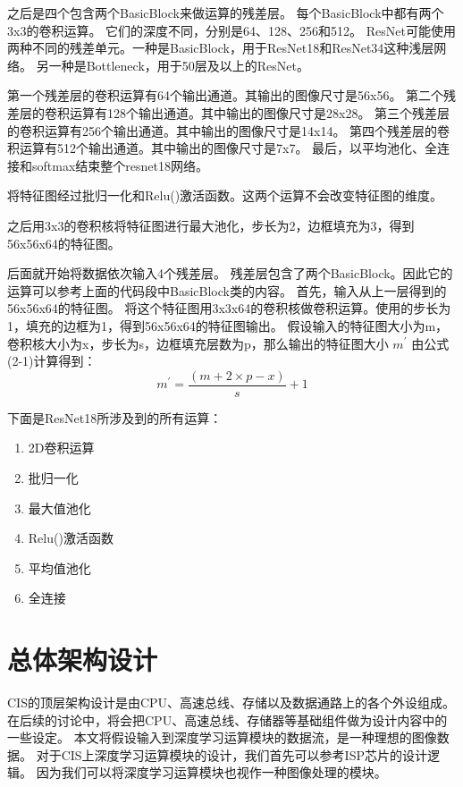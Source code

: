 之后是四个包含两个BasicBlock来做运算的残差层。
每个BasicBlock中都有两个3x3的卷积运算。
它们的深度不同，分别是64、128、256和512。
ResNet可能使用两种不同的残差单元。一种是BasicBlock，用于ResNet18和ResNet34这种浅层网络。
另一种是Bottleneck，用于50层及以上的ResNet。

第一个残差层的卷积运算有64个输出通道。其输出的图像尺寸是56x56。
第二个残差层的卷积运算有128个输出通道。其中输出的图像尺寸是28x28。
第三个残差层的卷积运算有256个输出通道。其中输出的图像尺寸是14x14。
第四个残差层的卷积运算有512个输出通道。其中输出的图像尺寸是7x7。
最后，以平均池化、全连接和softmax结束整个resnet18网络。


将特征图经过批归一化和Relu()激活函数。这两个运算不会改变特征图的维度。

之后用3x3的卷积核将特征图进行最大池化，步长为2，边框填充为3，得到56x56x64的特征图。

后面就开始将数据依次输入4个残差层。
残差层包含了两个BasicBlock。因此它的运算可以参考上面的代码段中BasicBlock类的内容。
首先，输入从上一层得到的56x56x64的特征图。
将这个特征图用3x3x64的卷积核做卷积运算。使用的步长为1，填充的边框为1，得到56x56x64的特征图输出。
假设输入的特征图大小为m，卷积核大小为x，步长为s，边框填充层数为p，那么输出的特征图大小 $m^{'}$ 由公式(2-1)计算得到：
\begin{equation}
m^{'} = \frac{( m + 2 \times p - x )}{s} + 1 
\end{equation}  


下面是ResNet18所涉及到的所有运算：
\begin{enumerate}
    \item 2D卷积运算
    \item 批归一化
    \item 最大值池化
    \item Relu()激活函数
    \item 平均值池化
    \item 全连接
\end{enumerate}


\section{总体架构设计}
CIS的顶层架构设计是由CPU、高速总线、存储以及数据通路上的各个外设组成。
在后续的讨论中，将会把CPU、高速总线、存储器等基础组件做为设计内容中的一些设定。
本文将假设输入到深度学习运算模块的数据流，是一种理想的图像数据。
对于CIS上深度学习运算模块的设计，我们首先可以参考ISP芯片的设计逻辑。
因为我们可以将深度学习运算模块也视作一种图像处理的模块。

